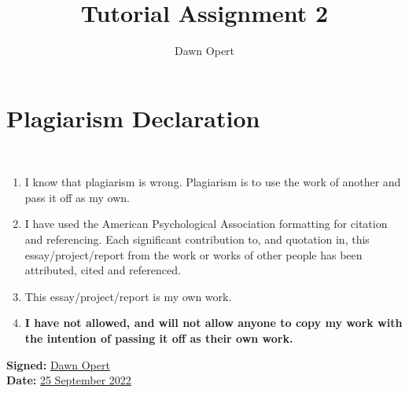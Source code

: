 \documentclass[stu,a4paper,12pt,donotrepeattitle]{apa7}
\title{Tutorial Assignment 2}
\author{Dawn Opert}
\affiliation{OPRNET001}
\begin{document}
\maketitle
\section{Plagiarism Declaration}
\\[1in]
\begin{enumerate}
    \item I know that plagiarism is wrong. Plagiarism is to use the work of
        another and pass it off as my own.
    \item I have used the American Psychological Association formatting for
        citation and referencing. Each significant contribution to, and
        quotation in, this essay/project/report from the work or works of other
        people has been attributed, cited and referenced.
    \item This essay/project/report is my own work.
    \item \textbf{I have not allowed, and will not allow anyone to copy my work
        with the intention of passing it off as their own work.}
\end{enumerate}

\textbf{Signed:} \underline{Dawn Opert}\\
\textbf{Date:} \underline{25 September 2022}
\newpage
\end{document}
